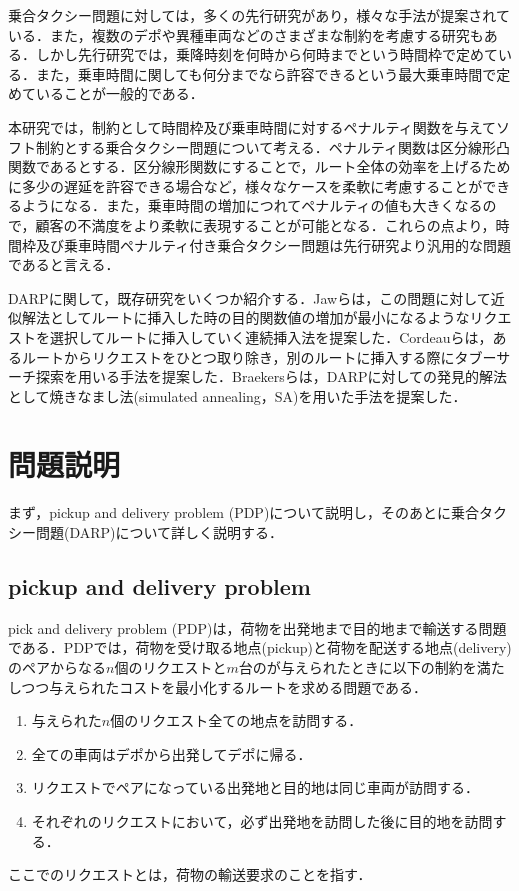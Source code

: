 \documentclass[a4j,11pt,twocolumn]{jsarticle}
\begin{document}
乗合タクシー問題に対しては，多くの先行研究があり，様々な手法が提案されている．また，複数のデポや異種車両などのさまざまな制約を考慮する研究もある．しかし先行研究では，乗降時刻を何時から何時までという時間枠で定めている．また，乗車時間に関しても何分までなら許容できるという最大乗車時間で定めていることが一般的である．

本研究では，制約として時間枠及び乗車時間に対するペナルティ関数を与えてソフト制約とする乗合タクシー問題について考える．ペナルティ関数は区分線形凸関数であるとする．区分線形関数にすることで，ルート全体の効率を上げるために多少の遅延を許容できる場合など，様々なケースを柔軟に考慮することができるようになる．また，乗車時間の増加につれてペナルティの値も大きくなるので，顧客の不満度をより柔軟に表現することが可能となる．これらの点より，時間枠及び乗車時間ペナルティ付き乗合タクシー問題は先行研究より汎用的な問題であると言える．

DARPに関して，既存研究をいくつか紹介する．Jawらは，この問題に対して近似解法としてルートに挿入した時の目的関数値の増加が最小になるようなリクエストを選択してルートに挿入していく連続挿入法を提案した\cite{insertion}．Cordeauらは，あるルートからリクエストをひとつ取り除き，別のルートに挿入する際にタブーサーチ探索を用いる手法を提案した\cite{tabu}．Braekersらは，DARPに対しての発見的解法として焼きなまし法(simulated annealing，SA)を用いた手法を提案した\cite{SA}．


\section{問題説明}
まず，pickup and delivery problem (PDP)について説明し，そのあとに乗合タクシー問題(DARP)について詳しく説明する．
\subsection{{\large pickup and delivery problem}}
pick and delivery problem (PDP)は，荷物を出発地まで目的地まで輸送する問題である．PDPでは，荷物を受け取る地点(pickup)と荷物を配送する地点(delivery)のペアからなる$n$個のリクエストと$m$台のが与えられたときに以下の制約を満たしつつ与えられたコストを最小化するルートを求める問題である．
\begin{enumerate}
 \item 与えられた$n$個のリクエスト全ての地点を訪問する．
 \item 全ての車両はデポから出発してデポに帰る．
 \item リクエストでペアになっている出発地と目的地は同じ車両が訪問する．
 \item それぞれのリクエストにおいて，必ず出発地を訪問した後に目的地を訪問する．
\end{enumerate}
ここでのリクエストとは，荷物の輸送要求のことを指す．
\end{document}
